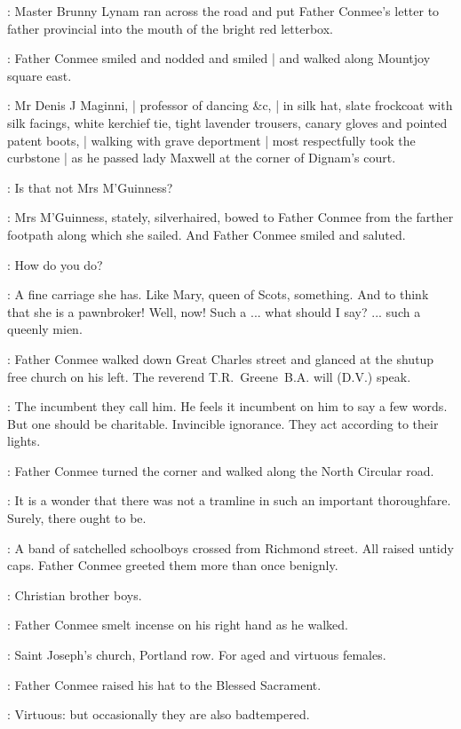 :
Master Brunny Lynam ran across the road
and put Father Conmee's letter to father provincial
into the mouth of the bright red letterbox.

:
Father Conmee smiled and nodded and smiled |
and walked along Mountjoy square east.

:
Mr Denis J Maginni, |
professor of dancing \&c, |
in silk hat,
slate frockcoat with silk facings,
white kerchief tie,
tight lavender trousers,
canary gloves
and pointed patent boots, |
walking with grave deportment |
most respectfully took the curbstone |
as he passed lady Maxwell
at the corner of Dignam's court.

\conmeeint:
Is that not Mrs M'Guinness?

:
Mrs M'Guinness,
stately, silverhaired,
bowed to Father Conmee from the farther footpath
along which she sailed.
And Father Conmee smiled and saluted.

\conmee:
How do you do?

\conmeeint:
A fine carriage she has.
Like Mary, queen of Scots, something.
And to think that she is a pawnbroker!
Well, now!
Such a ...
what should I say? ...
such a queenly mien.

:
Father Conmee walked down Great Charles street
and glanced at the shutup free church on his left.
The reverend T.R.~Greene~B.A. will (D.V.) speak.

\conmeeint:
The incumbent they call him.
He feels it incumbent on him to say a few words.
But one should be charitable.
Invincible ignorance.
They act according to their lights.

:
Father Conmee turned the corner
and walked along the North Circular road.

\conmeeint:
It is a wonder that there was not a tramline
in such an important thoroughfare.
Surely, there ought to be.

:
A band of satchelled schoolboys crossed from Richmond street.
All raised untidy caps.
Father Conmee greeted them more than once benignly.

\conmeeint:
Christian brother boys.

:
Father Conmee smelt incense on his right hand as he walked.

\conmeeint:
Saint Joseph's church, Portland row.
For aged and virtuous females.

:
Father Conmee raised his hat to the Blessed Sacrament.

\conmeeint:
Virtuous: but occasionally they are also badtempered.

